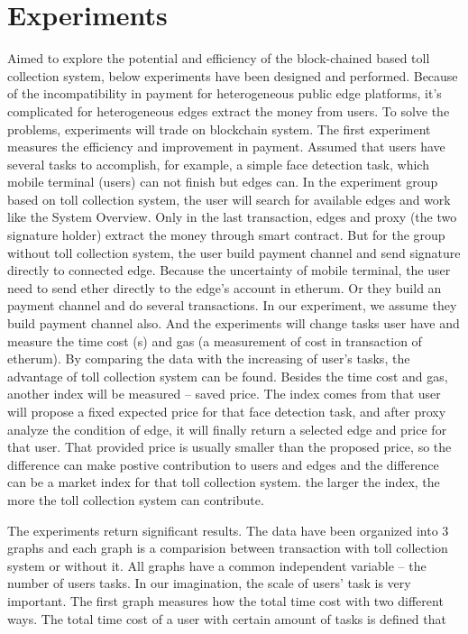 \documentclass[10pt, conference, letterpaper]{IEEEtran}
\begin{document}
\section{Experiments}
Aimed to explore the potential and efficiency of the block-chained based toll collection system, below experiments have been designed and performed. Because of the incompatibility in payment for heterogeneous public edge platforms, it's complicated for heterogeneous edges extract the money from users. To solve the problems, experiments will trade on blockchain system. The first experiment measures the efficiency and improvement in payment. Assumed that users have several tasks to accomplish, for example, a simple face detection task, which mobile terminal (users) can not finish but edges can. In the experiment group based on toll collection system, the user will search for available edges and work like the {System Overview}. Only in the last transaction, edges and proxy (the two signature holder) extract the money through smart contract. But for the group without toll collection system, the user build payment channel and send signature directly to connected edge. Because the uncertainty of mobile terminal, the user need to send ether directly to the edge's account in etherum. Or they build an payment channel and do several transactions. In our experiment, we assume they build payment channel also. And the experiments will change tasks user have and measure the time cost (s) and gas (a measurement of cost in transaction of etherum). By comparing the data with the increasing of user's tasks, the advantage of toll collection system can be found. Besides the time cost and gas, another index will be measured -- saved price. The index comes from that user will propose a fixed expected price for that face detection task, and after proxy analyze the condition of edge, it will finally return a selected edge and price for that user. That provided price is usually smaller than the proposed price, so the difference can make postive contribution to users and edges and the difference can be a market index for that toll collection system. the larger the index, the more the toll collection system can contribute.

The experiments return significant results. The data have been organized into 3 graphs and each graph is a comparision between transaction with toll collection system or without it. All graphs have a common independent variable -- the number of users tasks. In our imagination, the scale of users' task is very important. The first graph measures how the total time cost with two different ways. The total time cost of a user with certain amount of tasks is defined that 
\end{document}
